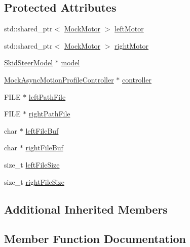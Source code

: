 \subsection*{Protected Attributes}
\begin{DoxyCompactItemize}
\item 
std\+::shared\+\_\+ptr$<$ \mbox{\hyperlink{classokapi_1_1MockMotor}{Mock\+Motor}} $>$ \mbox{\hyperlink{classAsyncMotionProfileControllerTest_a551cf22f96d8b0b474bc8ca4b38a0d98}{left\+Motor}}
\item 
std\+::shared\+\_\+ptr$<$ \mbox{\hyperlink{classokapi_1_1MockMotor}{Mock\+Motor}} $>$ \mbox{\hyperlink{classAsyncMotionProfileControllerTest_a22706fba8edf12704c22719dafde4702}{right\+Motor}}
\item 
\mbox{\hyperlink{classokapi_1_1SkidSteerModel}{Skid\+Steer\+Model}} $\ast$ \mbox{\hyperlink{classAsyncMotionProfileControllerTest_adc064220539c5d49d699611a1a690cce}{model}}
\item 
\mbox{\hyperlink{classMockAsyncMotionProfileController}{Mock\+Async\+Motion\+Profile\+Controller}} $\ast$ \mbox{\hyperlink{classAsyncMotionProfileControllerTest_a9f1a1853a1ca874be7a9d5ad9274ea47}{controller}}
\item 
F\+I\+LE $\ast$ \mbox{\hyperlink{classAsyncMotionProfileControllerTest_aba28c1824a7b52cfa20d2d07d759e8ad}{left\+Path\+File}}
\item 
F\+I\+LE $\ast$ \mbox{\hyperlink{classAsyncMotionProfileControllerTest_a92b4d6e617bf1568008bf0a49a2dc27f}{right\+Path\+File}}
\item 
char $\ast$ \mbox{\hyperlink{classAsyncMotionProfileControllerTest_aafc3727c1c04e324dfc57e5ab83e7ef1}{left\+File\+Buf}}
\item 
char $\ast$ \mbox{\hyperlink{classAsyncMotionProfileControllerTest_acdbd82f63741291362075c78d40220a0}{right\+File\+Buf}}
\item 
size\+\_\+t \mbox{\hyperlink{classAsyncMotionProfileControllerTest_a8a651352a1d77117fdff963c73dd6890}{left\+File\+Size}}
\item 
size\+\_\+t \mbox{\hyperlink{classAsyncMotionProfileControllerTest_a7c885cb82aa4ff915d628f6fde2b8ac9}{right\+File\+Size}}
\end{DoxyCompactItemize}
\subsection*{Additional Inherited Members}


\subsection{Member Function Documentation}
\mbox{\label{classAsyncMotionProfileControllerTest_a0875f817554a6328621a95b889ec17d6}} 
